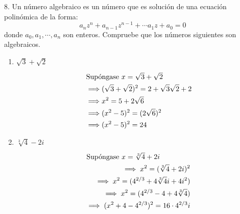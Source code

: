 \documentclass[a4paper,12pt]{article}
\begin{document}
8. Un número algebraico es un número que es solución de una ecuación polinómica de la forma:
$$
a_{n} z^{n}+a_{n-1} z^{n-1}+\cdots a_{1} z+a_{0}=0
$$
donde $a_{0}, a_{1}, \cdots, a_{n}$ son enteros. Compruebe que los números siguientes son algebraicos.
\begin{enumerate}
    \item $\sqrt{3}+\sqrt{2}$
    \begin{align}
        \intertext{Supóngase $x=\sqrt{3}+\sqrt{2}$}
        \implies& (\sqrt{3}+\sqrt{2})^2=2+\sqrt{3}\sqrt{2}+2\\
        \implies& x^2=5+2\sqrt{6}\\ \implies& (x^2-5)^2=(2\sqrt{6})^2\\
        \implies& (x^2-5)^2=24
    \end{align}
    \item $\sqrt[3]{4}-2 i$
    \begin{align}
        \intertext{Supóngase $x=\sqrt[3]{4}+2i$}
        \implies x^2=(\sqrt[3]{4}+2i)^2\\
        \implies x^2= (4^{2/3}+4\sqrt[3]{4}i+4i^2)\\
        \implies x^2= (4^{2/3}-4+4\sqrt[3]{4})\\
        \implies (x^2+4-4^{2/3})^2=16\cdot 4^{2/3}i
    \end{align}
\end{enumerate}
\end{document}
